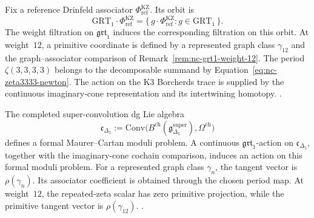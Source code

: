 \begin{remark}
\label{rem:nc-grt1-orbit-description}
Fix a reference Drinfeld associator
\(\Phi^{\mathrm{KZ}}_{\mathrm{ref}}\).  Its orbit is
\[
 \mathrm{GRT}_1\cdot\Phi^{\mathrm{KZ}}_{\mathrm{ref}}
 =
 \{\,g\cdot\Phi^{\mathrm{KZ}}_{\mathrm{ref}}:
      g\in\mathrm{GRT}_1\,\}.
\]
The weight filtration on \(\mathfrak{grt}_1\) induces the corresponding
filtration on this orbit.  At weight~$12$, a primitive coordinate is
defined by a represented graph class \(\gamma_{12}\) and the
graph--associator comparison of
Remark~\ref{rem:nc-grt1-weight-12}.  The period
\(\zeta(3,3,3,3)\) belongs to the decomposable summand by
Equation~\eqref{eq:nc-zeta3333-newton}.  The action on the K3
Borcherds trace is supplied by the continuous imaginary-cone
representation and its intertwining homotopy.
\cite{Drinfeld1990,Willwacher2015,Brown2012}.
\end{remark}

\begin{remark}
\label{rem:nc-grt1-geometric-interpretation}
The completed super-convolution dg Lie algebra
\[
 \mathfrak c_{\Delta_5}:=
 \mathrm{Conv}\bigl(
 B^{\mathrm{ch}}(\mathfrak g_{\Delta_5}^{\mathrm{super}}),
 \Omega^{\mathrm{ch}}\bigr)
\]
defines a formal Maurer--Cartan moduli problem.  A continuous
\(\mathfrak{grt}_1\)-action on \(\mathfrak c_{\Delta_5}\), together
with the imaginary-cone cochain comparison, induces an action on this
formal moduli problem.  For a represented graph class
\(\gamma_n\), the tangent vector is
\(\rho(\gamma_n)\).  Its associator coefficient is obtained through
the chosen period map.  At weight~$12$, the repeated-zeta scalar has
zero primitive projection, while the primitive tangent vector is
\(\rho(\gamma_{12})\).
\cite{Kontsevich2003,Willwacher2015,Drinfeld1990}.
\end{remark}

